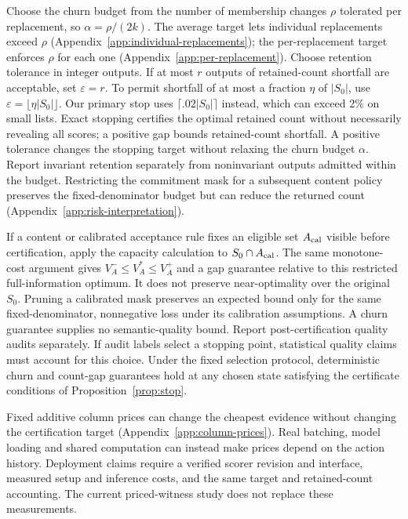 Choose the churn budget from the number of membership changes $\rho$ tolerated per replacement, so $\alpha=\rho/(2k)$. The average target lets individual replacements exceed $\rho$ (Appendix~\ref{app:individual-replacements}); the per-replacement target enforces $\rho$ for each one (Appendix~\ref{app:per-replacement}). Choose retention tolerance in integer outputs. If at most $r$ outputs of retained-count shortfall are acceptable, set $\varepsilon=r$. To permit shortfall of at most a fraction $\eta$ of $|S_0|$, use $\varepsilon=\lfloor\eta|S_0|\rfloor$. Our primary stop uses $\lceil.02|S_0|\rceil$ instead, which can exceed 2\% on small lists. Exact stopping certifies the optimal retained count without necessarily revealing all scores; a positive gap bounds retained-count shortfall. A positive tolerance changes the stopping target without relaxing the churn budget $\alpha$. Report invariant retention separately from noninvariant outputs admitted within the budget. Restricting the commitment mask for a subsequent content policy preserves the fixed-denominator budget but can reduce the returned count (Appendix~\ref{app:risk-interpretation}).

If a content or calibrated acceptance rule fixes an eligible set $A_{\rm cal}$ visible before certification, apply the capacity calculation to $S_0\cap A_{\rm cal}$. The same monotone-cost argument gives $V^-_A\le V^*_A\le V^+_A$ and a gap guarantee relative to this restricted full-information optimum. It does not preserve near-optimality over the original $S_0$. Pruning a calibrated mask preserves an expected bound only for the same fixed-denominator, nonnegative loss under its calibration assumptions. A churn guarantee supplies no semantic-quality bound. Report post-certification quality audits separately. If audit labels select a stopping point, statistical quality claims must account for this choice. Under the fixed selection protocol, deterministic churn and count-gap guarantees hold at any chosen state satisfying the certificate conditions of Proposition~\ref{prop:stop}.

Fixed additive column prices can change the cheapest evidence without changing the certification target (Appendix~\ref{app:column-prices}). Real batching, model loading and shared computation can instead make prices depend on the action history. Deployment claims require a verified scorer revision and interface, measured setup and inference costs, and the same target and retained-count accounting. The current priced-witness study does not replace these measurements.


